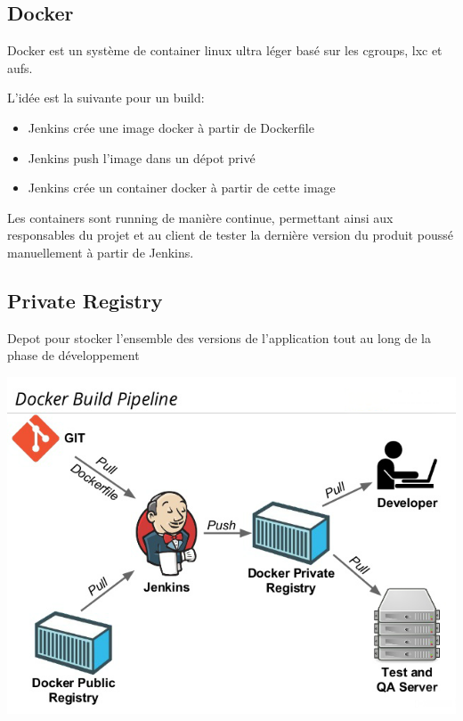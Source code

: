 \documentclass [a4paper,11pt]{article}
\begin{document}
\subsection{Docker}

Docker est un système de container linux ultra léger basé sur les cgroups, lxc et aufs.\newline

L'idée est la suivante pour un build:\newline

\begin{itemize}
 \item Jenkins crée une image docker à partir de Dockerfile
 \item Jenkins push l'image dans un dépot privé
 \item Jenkins crée un container docker à partir de cette image\newline
\end{itemize}

Les containers sont running de manière continue, permettant ainsi aux responsables du projet et au client de tester la dernière version du produit poussé manuellement à partir de Jenkins.

\subsection{Private Registry}

Depot pour stocker l'ensemble des versions de l'application tout au long de la phase de développement

\begin{center}
\includegraphics[scale=0.4]{img/registry.png}
\end{center}
\end{document}
